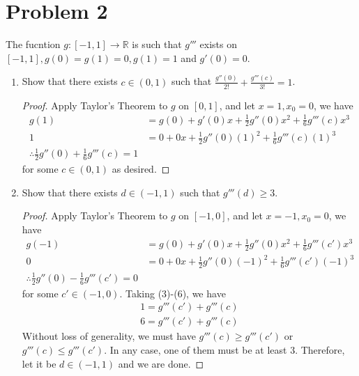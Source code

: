 \documentclass{article}
\theoremstyle{plain}
\newcommand{\R}{\mathbb{R}}
\begin{document}
\section*{Problem 2}
The fucntion $g:[-1,1]\to\R$ is such that $g'''$ exists on
$[-1,1], g(0)=g(1)=0,g(1)=1$ and $g'(0)=0$.
\begin{enumerate}
  \item Show that there exists $c\in(0,1)$ such that
        $\frac{g''(0)}{2!}+\frac{g'''(c)}{3!}=1$.
        \begin{proof}
          Apply Taylor's Theorem to $g$ on $[0,1]$, and let $x=1, x_{0}=0$, we
          have
          \begin{align}
            g(1)&=g(0)+g'(0)x+\frac{1}{2}g''(0)x^{2}+\frac{1}{6}g'''(c)x^{3}\\
1&=0+0x+\frac{1}{2}g''(0)(1)^{2}+\frac{1}{6}g'''(c)(1)^{3}\\
            \therefore \frac{1}{2}g''(0)+\frac{1}{6}g'''(c)=1
          \end{align}
          for some $c\in(0,1)$ as desired.
        \end{proof}
  \item Show that there exists $d\in(-1,1)$ such that $g'''(d)\geq 3$.
        \begin{proof}
          Apply Taylor's Theorem to $g$ on $[-1,0]$, and let $x=-1, x_{0}=0$, we
          have
          \begin{align}
            g(-1)&=g(0)+g'(0)x+\frac{1}{2}g''(0)x^{2}+\frac{1}{6}g'''(c')x^{3}\\
0&=0+0x+\frac{1}{2}g''(0)(-1)^{2}+\frac{1}{6}g'''(c')(-1)^{3}\\
            \therefore \frac{1}{2}g''(0)-\frac{1}{6}g'''(c')=0
          \end{align}
          for some $c'\in(-1,0)$. Taking (3)-(6), we have
          \begin{align*}
            1 = g'''(c') + g'''(c)\\
            6 = g'''(c') + g'''(c)
          \end{align*}
          Without loss of generality, we must have $g'''(c)\geq g'''(c')$ or
          $g'''(c)\leq g'''(c')$. In any case, one of them must be at least $3$.
          Therefore, let it be $d\in(-1, 1)$ and we are done.
        \end{proof}
\end{enumerate}
\end{document}
